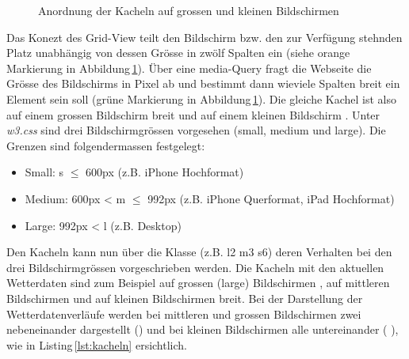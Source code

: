 \begin{figure}[h!]
	\centering
	\caption{Anordnung der Kacheln auf grossen und kleinen Bildschirmen}
	\label{img:kacheln2}
\end{figure}

\noindent
Das Konezt des Grid-View teilt den Bildschirm bzw. den zur Verfügung stehnden Platz unabhängig von dessen Grösse in zwölf Spalten ein (siehe orange Markierung in Abbildung\,\ref{img:kacheln2}). Über eine media-Query fragt die Webseite die Grösse des Bildschirms in Pixel ab und bestimmt dann wieviele Spalten breit ein Element sein soll (grüne Markierung in Abbildung\,\ref{img:kacheln2}). Die gleiche Kachel ist also auf einem grossen Bildschirm   breit und auf einem kleinen Bildschirm . Unter \emph{w3.css} sind drei Bildschirmgrössen vorgesehen (small, medium und large). Die Grenzen sind folgendermassen festgelegt:

\begin{itemize}
\item Small: s $\leq$ 600px (z.B. iPhone Hochformat)
\item Medium: 600px < m $\leq$ 992px (z.B. iPhone Querformat, iPad Hochformat)
\item Large: 992px < l (z.B. Desktop)
\end{itemize}

\noindent
Den Kacheln kann nun über die Klasse (z.B. l2 m3 s6) deren Verhalten bei den drei Bildschirmgrössen vorgeschrieben werden. Die Kacheln mit den aktuellen Wetterdaten sind zum Beispiel auf grossen (large) Bildschirmen , auf mittleren Bildschirmen  und auf kleinen Bildschirmen  breit. Bei der Darstellung der Wetterdatenverläufe werden bei mittleren und grossen Bildschirmen zwei nebeneinander dargestellt () und bei kleinen Bildschirmen alle untereinander ( ), wie in Listing\,\ref{lst:kacheln} ersichtlich.

